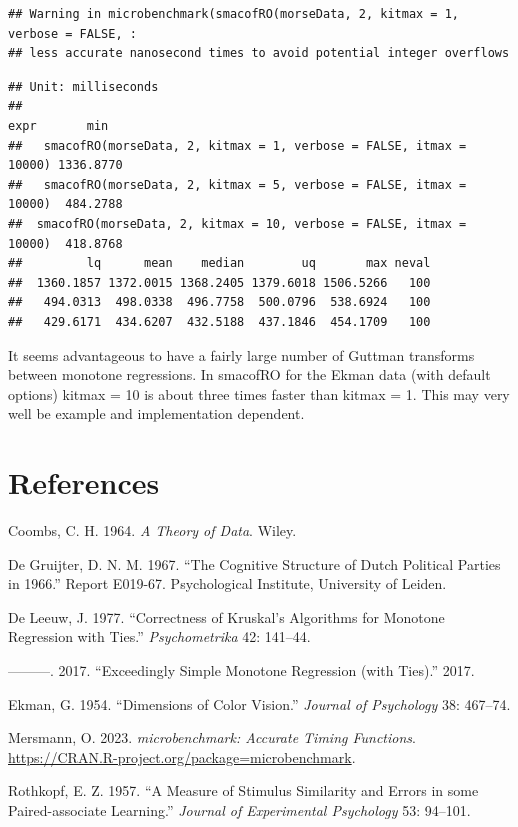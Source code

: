 \documentclass[
  12pt,
]{article}
\newlength{\cslhangindent}
\newenvironment{CSLReferences}[2] %
 {\begin{list}{}{%
  \setlength{\itemindent}{0pt}
  \setlength{\leftmargin}{0pt}
  \setlength{\parsep}{0pt}
  \ifodd #1
   \setlength{\leftmargin}{\cslhangindent}
   \setlength{\itemindent}{-1\cslhangindent}
  \fi
  \setlength{\itemsep}{#2\baselineskip}}}
 {\end{list}}
\begin{document}
\begin{verbatim}
## Warning in microbenchmark(smacofRO(morseData, 2, kitmax = 1, verbose = FALSE, :
## less accurate nanosecond times to avoid potential integer overflows
\end{verbatim}

\begin{verbatim}
## Unit: milliseconds
##                                                                 expr       min
##   smacofRO(morseData, 2, kitmax = 1, verbose = FALSE, itmax = 10000) 1336.8770
##   smacofRO(morseData, 2, kitmax = 5, verbose = FALSE, itmax = 10000)  484.2788
##  smacofRO(morseData, 2, kitmax = 10, verbose = FALSE, itmax = 10000)  418.8768
##         lq      mean    median        uq       max neval
##  1360.1857 1372.0015 1368.2405 1379.6018 1506.5266   100
##   494.0313  498.0338  496.7758  500.0796  538.6924   100
##   429.6171  434.6207  432.5188  437.1846  454.1709   100
\end{verbatim}

It seems advantageous to have a fairly large number of Guttman transforms between monotone regressions. In smacofRO for the Ekman data (with default options) kitmax = 10 is about three times faster than kitmax = 1.
This may very well be example and implementation dependent.

\section*{References}\label{references}

\label{refs}
\begin{CSLReferences}{1}{0}
Coombs, C. H. 1964. \emph{{A Theory of Data}}. Wiley.

De Gruijter, D. N. M. 1967. {``{The Cognitive Structure of Dutch Political Parties in 1966}.''} Report E019-67. Psychological Institute, University of Leiden.

De Leeuw, J. 1977. {``Correctness of Kruskal's Algorithms for Monotone Regression with Ties.''} \emph{Psychometrika} 42: 141--44.

---------. 2017. {``{Exceedingly Simple Monotone Regression (with Ties)}.''} 2017.

Ekman, G. 1954. {``{Dimensions of Color Vision}.''} \emph{Journal of Psychology} 38: 467--74.

Mersmann, O. 2023. \emph{{microbenchmark: Accurate Timing Functions}}. \url{https://CRAN.R-project.org/package=microbenchmark}.

Rothkopf, E. Z. 1957. {``{A Measure of Stimulus Similarity and Errors in some Paired-associate Learning}.''} \emph{Journal of Experimental Psychology} 53: 94--101.

\end{CSLReferences}
\end{document}
